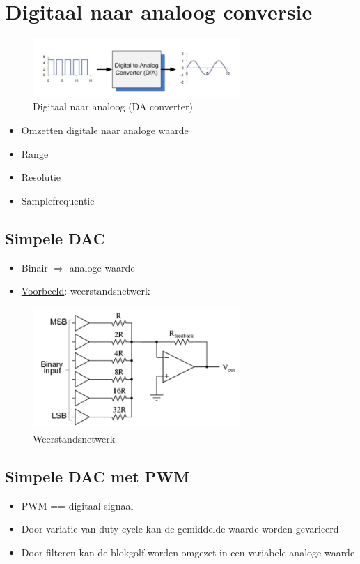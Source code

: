 \documentclass{article}
\begin{document}
\section{Digitaal naar analoog conversie}
\begin{figure}[H]
    \centering
    \includegraphics[width=0.7\textwidth]{Screenshot_20200224_115212.png}
    \caption{Digitaal naar analoog (DA converter)}
\end{figure}

\begin{itemize}
    \item Omzetten digitale naar analoge waarde
    \item Range
    \item Resolutie
    \item Samplefrequentie
\end{itemize}

\subsection{Simpele DAC}
\begin{itemize}
    \item Binair $\Rightarrow$ analoge waarde
    \item \underline{Voorbeeld}: weerstandsnetwerk
\end{itemize}

\begin{figure}[H]
    \centering
    \includegraphics[width=0.7\textwidth]{Screenshot_20200224_123043.png}
    \caption{Weerstandsnetwerk}
\end{figure}

\subsection{Simpele DAC met PWM}
\begin{itemize}
    \item PWM == digitaal signaal
    \item Door variatie van duty-cycle kan de gemiddelde waarde worden gevarieerd
    \item Door filteren kan de blokgolf worden omgezet in een variabele analoge waarde 
\end{itemize}
\end{document}
